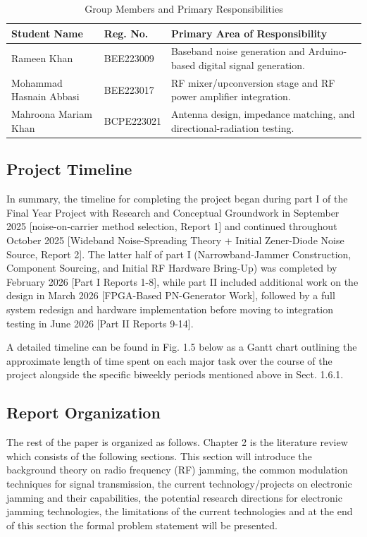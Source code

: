 \documentclass[12pt,a4paper]{report}
\begin{document}
	\begin{table}[H]
		\centering
		\caption{Group Members and Primary Responsibilities}
		\label{tab:group_members}
		\renewcommand{\arraystretch}{1.3}
		
		\begin{tabularx}{\textwidth}{|p{4cm}|p{2.5cm}|X|}
			\hline
			\textbf{Student Name} & \textbf{Reg. No.} & \textbf{Primary Area of Responsibility} \\
			\hline
			
			Rameen Khan &
			BEE223009 &
			Baseband noise generation and Arduino-based digital signal generation. \\
			\hline
			
			Mohammad Hasnain Abbasi &
			BEE223017 &
			RF mixer/upconversion stage and RF power amplifier integration. \\
			\hline
			
			Mahroona Mariam Khan &
			BCPE223021 &
			Antenna design, impedance matching, and directional-radiation testing. \\
			\hline
			
		\end{tabularx}
	\end{table}
	\subsection{Project Timeline}
	In summary, the timeline for completing the project began during part I of the Final Year Project with Research and Conceptual Groundwork in September 2025 [noise-on-carrier method selection, Report 1] and continued throughout October 2025 [Wideband Noise-Spreading Theory + Initial Zener-Diode Noise Source, Report 2]. The latter half of part I (Narrowband-Jammer Construction, Component Sourcing, and Initial RF Hardware Bring-Up) was completed by February 2026 [Part I Reports 1-8], while part II included additional work on the design in March 2026 [FPGA-Based PN-Generator Work], followed by a full system redesign and hardware implementation before moving to integration testing in June 2026 [Part II Reports 9-14].
	
	\vspace{0.5cm}
	
	A detailed timeline can be found in Fig. 1.5 below as a Gantt chart outlining the approximate length of time spent on each major task over the course of the project alongside the specific biweekly periods mentioned above in Sect. 1.6.1.
	\subsection{Report Organization}
	The rest of the paper is organized as follows. Chapter 2 is the literature review which consists of the following sections. This section will introduce the background theory on radio frequency (RF) jamming, the common modulation techniques for signal transmission, the current technology/projects on electronic jamming and their capabilities, the potential research directions for electronic jamming technologies, the limitations of the current technologies and at the end of this section the formal problem statement will be presented. 
	
\end{document}
